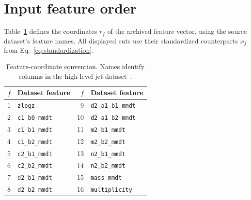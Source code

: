 \section{Input feature order}
\label{app:features}
Table~\ref{tab:features} defines the coordinates $r_f$ of the archived feature
vector, using the source dataset's feature names. All displayed cuts use their
standardized counterparts $x_f$ from Eq.~\eqref{eq:standardization}.
\begin{table}[H]\centering\small
\caption{Feature-coordinate convention. Names identify columns in the
high-level jet dataset~\cite{openml42468}.}\label{tab:features}
\begin{tabular}{@{}rlrl@{}}\toprule
$f$ & Dataset feature & $f$ & Dataset feature\\\midrule
1 & \texttt{zlogz} & 9 & \texttt{d2\_a1\_b1\_mmdt}\\
2 & \texttt{c1\_b0\_mmdt} & 10 & \texttt{d2\_a1\_b2\_mmdt}\\
3 & \texttt{c1\_b1\_mmdt} & 11 & \texttt{m2\_b1\_mmdt}\\
4 & \texttt{c1\_b2\_mmdt} & 12 & \texttt{m2\_b2\_mmdt}\\
5 & \texttt{c2\_b1\_mmdt} & 13 & \texttt{n2\_b1\_mmdt}\\
6 & \texttt{c2\_b2\_mmdt} & 14 & \texttt{n2\_b2\_mmdt}\\
7 & \texttt{d2\_b1\_mmdt} & 15 & \texttt{mass\_mmdt}\\
8 & \texttt{d2\_b2\_mmdt} & 16 & \texttt{multiplicity}\\\bottomrule
\end{tabular}
\end{table}
